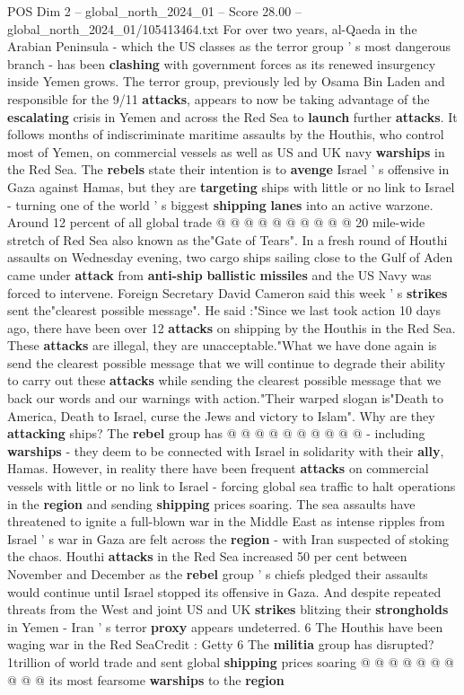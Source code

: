 \begin{textsample}{POS Dim 2 – global\_north\_2024\_01 – Score 28.00 – global\_north\_2024\_01/105413464.txt}
For over two years, al-Qaeda in the Arabian Peninsula - which the US classes as the terror group ' s most dangerous branch - has been \textbf{clashing} with government forces as its renewed insurgency inside Yemen grows.
The terror group, previously led by Osama Bin Laden and responsible for the 9/11 \textbf{attacks}, appears to now be taking advantage of the \textbf{escalating} crisis in Yemen and across the Red Sea to \textbf{launch} further \textbf{attacks}.
It follows months of indiscriminate maritime assaults by the Houthis, who control most of Yemen, on commercial vessels as well as US and UK navy \textbf{warships} in the Red Sea.
The \textbf{rebels} state their intention is to \textbf{avenge} Israel ' s offensive in Gaza against Hamas, but they are \textbf{targeting} ships with little or no link to Israel - turning one of the world ' s biggest \textbf{shipping} \textbf{lanes} into an active warzone.
Around 12 percent of all global trade @ @ @ @ @ @ @ @ @ @ 20 mile-wide stretch of Red Sea also known as the"Gate of Tears".
In a fresh round of Houthi assaults on Wednesday evening, two cargo ships sailing close to the Gulf of Aden came under \textbf{attack} from \textbf{anti-ship} \textbf{ballistic} \textbf{missiles} and the US Navy was forced to intervene.
Foreign Secretary David Cameron said this week ' s \textbf{strikes} sent the"clearest possible message".
He said :"Since we last took action 10 days ago, there have been over 12 \textbf{attacks} on shipping by the Houthis in the Red Sea.
These \textbf{attacks} are illegal, they are unacceptable."What we have done again is send the clearest possible message that we will continue to degrade their ability to carry out these \textbf{attacks} while sending the clearest possible message that we back our words and our warnings with action."Their warped slogan is"Death to America, Death to Israel, curse the Jews and victory to Islam".
Why are they \textbf{attacking} ships?
The \textbf{rebel} group has @ @ @ @ @ @ @ @ @ @ - including \textbf{warships} - they deem to be connected with Israel in solidarity with their \textbf{ally}, Hamas.
However, in reality there have been frequent \textbf{attacks} on commercial vessels with little or no link to Israel - forcing global sea traffic to halt operations in the \textbf{region} and sending \textbf{shipping} prices soaring.
The sea assaults have threatened to ignite a full-blown war in the Middle East as intense ripples from Israel ' s war in Gaza are felt across the \textbf{region} - with Iran suspected of stoking the chaos.
Houthi \textbf{attacks} in the Red Sea increased 50 per cent between November and December as the \textbf{rebel} group ' s chiefs pledged their assaults would continue until Israel stopped its offensive in Gaza.
And despite repeated threats from the West and joint US and UK \textbf{strikes} blitzing their \textbf{strongholds} in Yemen - Iran ' s terror \textbf{proxy} appears undeterred. 6 The Houthis have been waging war in the Red SeaCredit : Getty 6 The \textbf{militia} group has disrupted? 1trillion of world trade and sent global \textbf{shipping} prices soaring @ @ @ @ @ @ @ @ @ @ its most fearsome \textbf{warships} to the \textbf{region}


\end{textsample}
